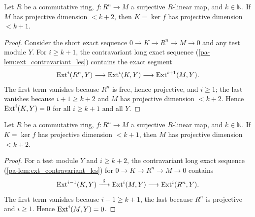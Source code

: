\begin{lemma}
  \label{pa-lem:syzygy_descent}
  \leanok

  Let \(R\) be a commutative ring, \(f : R^n \to M\) a surjective \(R\)-linear map, and
  \(k \in \mathbb{N}\). If \(M\) has projective dimension \(< k + 2\), then
  \(K = \ker f\) has projective dimension \(< k + 1\).
\end{lemma}
\begin{proof}
  \leanok
  Consider the short exact sequence \(0 \to K \to R^n \to M \to 0\) and any test module
  \(Y\). For \(i \geq k + 1\), the contravariant long exact sequence
  (\ref{pa-lem:ext_contravariant_les}) contains the exact segment
  \[
    \operatorname{Ext}^i(R^n, Y) \longrightarrow \operatorname{Ext}^i(K, Y) \longrightarrow \operatorname{Ext}^{i+1}(M, Y).
  \]
  The first term vanishes because \(R^n\) is free, hence projective, and \(i \geq 1\);
  the last vanishes because \(i + 1 \geq k + 2\) and \(M\) has projective dimension
  \(< k+2\). Hence \(\operatorname{Ext}^i(K, Y) = 0\) for all \(i \geq k+1\) and all \(Y\).
\end{proof}

\begin{lemma}
  \label{pa-lem:syzygy_ascent}
  \leanok

  Let \(R\) be a commutative ring, \(f : R^n \to M\) a surjective \(R\)-linear map, and
  \(k \in \mathbb{N}\). If \(K = \ker f\) has projective dimension \(< k + 1\), then
  \(M\) has projective dimension \(< k + 2\).
\end{lemma}
\begin{proof}
  \leanok
  For a test module \(Y\) and \(i \geq k + 2\), the contravariant long exact sequence
  (\ref{pa-lem:ext_contravariant_les}) for \(0 \to K \to R^n \to M \to 0\) contains
  \[
    \Ext^{i-1}(K, Y) \xrightarrow{\ \delta\ } \Ext^{i}(M, Y) \longrightarrow
      \Ext^{i}(R^n, Y).
  \]
  The first term vanishes because \(i - 1 \geq k + 1\), the last because \(R^n\) is
  projective and \(i \geq 1\). Hence \(\operatorname{Ext}^i(M, Y) = 0\).
\end{proof}

